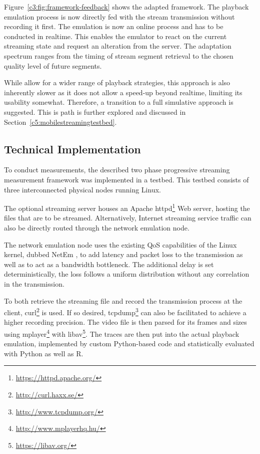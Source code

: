 Figure~\ref{c3:fig:framework-feedback} shows the adapted framework. The playback emulation process is now directly fed with the stream transmission without recording it first. The emulation is now an online process and has to be conducted in realtime. This enables the emulator to react on the current streaming state and request an alteration from the server. The adaptation spectrum ranges from the timing of stream segment retrieval to the chosen quality level of future segments. 

While allow for a wider range of playback strategies, this approach is also inherently slower as it does not allow a speed-up beyond realtime, limiting its usability somewhat. Therefore, a transition to a full simulative approach is suggested. This is path is further explored and discussed in Section~\ref{c5:mobilestreamingtestbed}.



\subsection{Technical Implementation}

To conduct measurements, the described two phase progressive streaming measurement framework was implemented in a testbed. This testbed consists of three interconnected physical nodes running Linux. 

The optional streaming server houses an Apache httpd\footnote{\url{https://httpd.apache.org/}} Web server, hosting the files that are to be streamed. Alternatively, Internet streaming service traffic can also be directly routed through the network emulation node.

The network emulation node uses the existing \gls{QoS} capabilities of the Linux kernel, dubbed NetEm \cite{hemminger2005network}, to add latency and packet loss to the transmission as well as to act as a bandwidth bottleneck. The additional delay is set deterministically, the loss follows a uniform distribution without any correlation in the transmission.

To both retrieve the streaming file and record the transmission process at the client, curl\footnote{\url{http://curl.haxx.se/}} is used. If so desired, tcpdump\footnote{\url{http://www.tcpdump.org/}} can also be facilitated to achieve a higher recording precision. The video file is then parsed for its frames and sizes using mplayer\footnote{\url{http://www.mplayerhq.hu/}} with libav\footnote{\url{https://libav.org/}}. The traces are then put into the actual playback emulation, implemented by custom Python-based code and statistically evaluated with Python as well as R.



